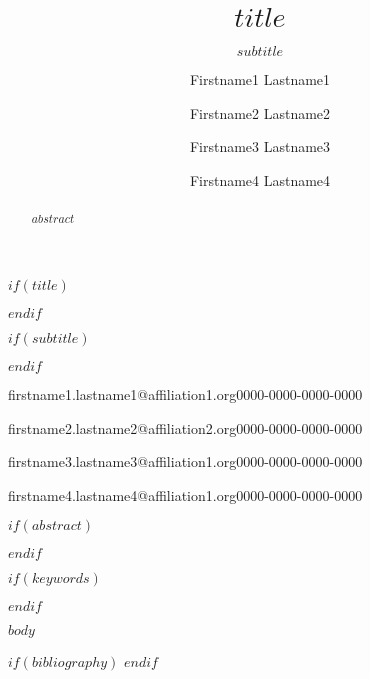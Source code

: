 \documentclass[
    $if(classoption)$
    $for(classoption)$$classoption$$sep$,$endfor$
    $endif$
]{$documentclass$}
\begin{document}
    $if(title)$
    \title[$shorttitle$]{$title$}
    $endif$

    $if(subtitle)$
    \subtitle{$subtitle$}
    $endif$

    \author[1,2]{Firstname1 Lastname1}{firstname1.lastname1@affiliation1.org}{0000-0000-0000-0000}
    \author[2]{Firstname2 Lastname2}{firstname2.lastname2@affiliation2.org}{0000-0000-0000-0000}
    \author[3]{Firstname3 Lastname3}{firstname3.lastname3@affiliation1.org}{0000-0000-0000-0000}
    \author[1]{Firstname4 Lastname4}{firstname4.lastname4@affiliation1.org}{0000-0000-0000-0000}%




    \maketitle

    $if(abstract)$
    \begin{abstract}
        $abstract$
    \end{abstract}
    $endif$

    $if(keywords)$
    $endif$

    $body$

    $if(bibliography)$
    \printbibliography
    $endif$
\end{document}

